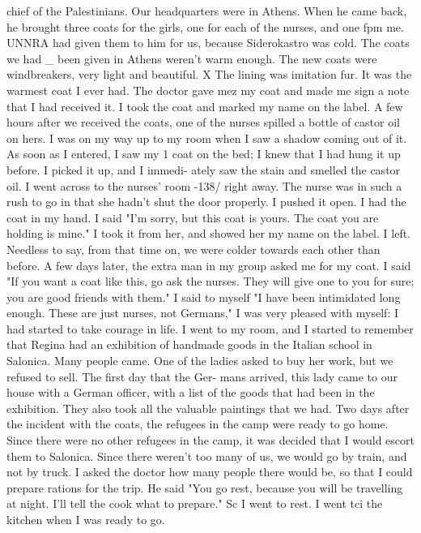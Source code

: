 chief of the Palestinians.
Our headquarters were in Athens.
When he came back, he 
brought three coats for the girls, one for each of the nurses, and one fpm me.
UNNRA had given them to him for us, because Siderokastro was cold.
The coats we had _ 
been given in Athens weren't warm enough.
The new coats were windbreakers, very 
light and beautiful.
X The lining was imitation fur.
It was the warmest coat I 
ever had.
The doctor gave mez my coat and made me sign a note that I had received it.
I 
took the coat and marked my name on the label.
A few hours after we received the 
coats, one of the nurses spilled a bottle of castor oil on hers.
I was on my way 
up to my room when I saw a shadow coming out of it.
As soon as I entered, I saw my 1 
coat on the bed; I knew that I had hung it up before.
I picked it up, and I immedi-
ately saw the stain and smelled the castor oil.
I went across to the nurses' room 
-138/ 
right away.
The nurse was in such a rush to go in that she hadn't shut the door 
properly.
I pushed it open.
I had the coat in my hand.
I said "I'm sorry, but 
this coat is yours.
The coat you are holding is mine."
I took it from her, and 
showed her my name on the label.
I left.
Needless to say, from that time on, we 
were colder towards each other than before.
A few days later, the extra man in my group asked me for my coat.
I said "If 
you want a coat like this, go ask the nurses.
They will give one to you for sure; 
you are good friends with them."
I said to myself "I have been intimidated long 
enough.
These are just nurses, not Germans," I was very pleased with myself: I 
had started to take courage in life.
I went to my room, and I started to remember that Regina had an exhibition of 
handmade goods in the Italian school in Salonica.
Many people came.
One of the 
ladies asked to buy her work, but we refused to sell.
The first day that the Ger-
mans arrived, this lady came to our house with a German officer, with a list of the 
goods that had been in the exhibition.
They also took all the valuable paintings 
that we had.
Two days after the incident with the coats, the refugees in the camp were ready 
to go home.
Since there were no other refugees in the camp, it was decided that I 
would escort them to Salonica.
Since there weren't too many of us, we would go by 
train, and not by truck.
I asked the doctor how many people there would be, so that 
I could prepare rations for the trip.
He said "You go rest, because you will be 
travelling at night.
I'll tell the cook what to prepare."
Sc I went to rest.
I went tci the kitchen when I was ready to go.
